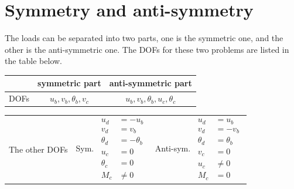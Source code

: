 \section{Symmetry and anti-symmetry}
The loads can be separated into two parts, one is the symmetric one, and the other is the anti-symmetric one. The DOFs for these two problems are listed in the table below.
\begin{center}
  \begin{tabular}{|c|c|c|}\hline
    & symmetric part & anti-symmetric part\\\hline
    DOFs & $u_b, v_b, \theta_b, v_c$ & $u_b, v_b, \theta_b, u_c, \theta_c$\\\hline
  \end{tabular}
\end{center}
\begin{fig}
  
\end{fig}
\begin{center}
  \renewcommand{\arraystretch}{1.2}
  \begin{tabular}{|c|c|c|}\hline
    \multirow{6}{*}{The other DOFs} & \multirow{6}{*}{Sym.\ $\begin{aligned}u_d &= -u_b\\ v_d &= v_b\\ \theta_d &= -\theta_b\\ u_c &= 0\\ \theta_c &= 0\\ M_c &\neq 0\end{aligned}$}
    & \multirow{6}{*}{Anti-sym.\ $\begin{aligned}u_d &= u_b\\ v_d &= -v_b\\ \theta_d &= \theta_b\\ v_c &= 0\\ u_c &\neq 0\\ M_c &= 0\end{aligned}$}\\
    &&\\ &&\\ &&\\ &&\\ &&\\\hline
  \end{tabular}
\end{center}

